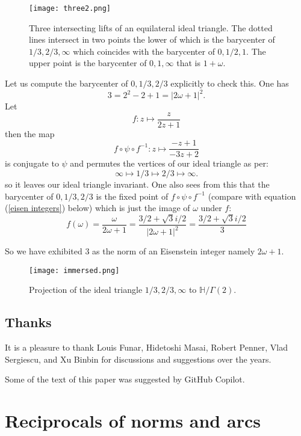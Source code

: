 \documentclass[12pt]{amsart}
\theoremstyle{plain}
\theoremstyle{definition}
\def\HH{\mathbb{H}}
\def\xx{\HH/g2}
\def\g2{\Gamma(2)}
\def\xx{\HH/\g2}
\begin{document}
  \begin{figure}[hb]
\begin{center}
\texttt{[image: three2.png]} 
\end{center}
\caption{Three intersecting  lifts  of an equilateral ideal triangle.
The dotted lines intersect in two points the lower of which 
is the barycenter of $1/3, 2/3,\infty$
which coincides with the barycenter of $0, 1/2,1$.
The upper point is the barycenter of $0,1,\infty$
that is $1+\omega$.}
\end{figure}
Let us compute the barycenter of $0,1/3,2/3$ explicitly to check this. 
One has
$$3 = 2^2 - 2 + 1 = | 2\omega + 1 |^2.$$
Let
$$f :  z \mapsto \frac{z}{2z+1}$$
then the map
$$ f \circ \psi \circ f^{-1} :  z \mapsto \frac{-z+ 1}{-3z+2}$$
is conjugate to $\psi$ and permutes the vertices of our ideal
triangle as per:
$$ \infty \mapsto 1/3 \mapsto 2/3 \mapsto \infty.$$
so it leaves our ideal triangle invariant.
One also sees from this that the barycenter of $0,1/3,2/3$
is the fixed point of $f \circ \psi \circ f^{-1}$ 
(compare with equation (\ref{eisen integers}) below)
which is just the image of $\omega$ under $f$:
$$ f(\omega) = \frac{\omega}{2\omega+1} 
= \frac{3/ 2+ \sqrt{3}i/2 }{|2 \omega + 1 |^2}
= \frac{3/ 2+ \sqrt{3}i/2 }{3}
$$

So we have exhibited $3$ as the norm of an Eisenstein integer namely
$2\omega + 1$. 


\begin{figure}[ht]
\begin{center}
\texttt{[image: immersed.png]} 
\end{center}
\caption{Projection of  the ideal triangle $1/3, 2/3,\infty$
to $\xx$.}
	\label{immersed triangle}
\end{figure}

 
\subsection{Thanks}

It is a pleasure to thank Louis Funar, Hidetoshi Masai, Robert
Penner, Vlad Sergiescu, and Xu Binbin for discussions and
suggestions over the years.

Some of the text of this paper was suggested by GitHub
Copilot\cite{copilot, vim_copilot}.

\section{Reciprocals of norms and arcs}
\end{document}
